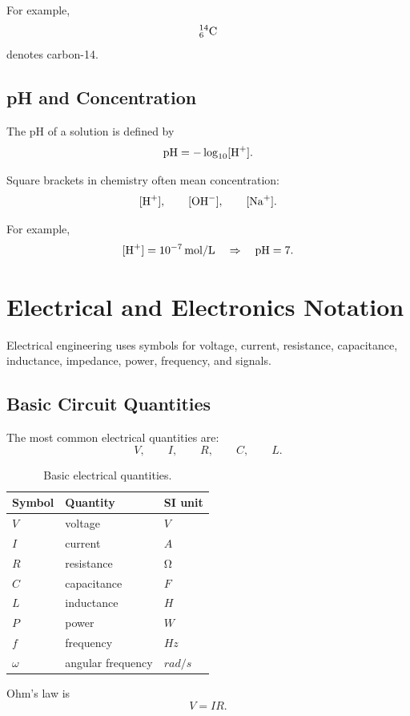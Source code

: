 \documentclass[11pt,twocolumn]{article}
\begin{document}
For example,
\[
{}^{14}_{6}\ce{C}
\]
denotes carbon-14.

\subsection{pH and Concentration}

The pH of a solution is defined by
\[
\mathrm{pH}
=
-\log_{10}[\ce{H+}].
\]

Square brackets in chemistry often mean concentration:
\[
[\ce{H+}],
\qquad
[\ce{OH-}],
\qquad
[\ce{Na+}].
\]

For example,
\[
[\ce{H+}]
=
10^{-7}\,\unit{mol/L}
\quad
\Rightarrow
\quad
\mathrm{pH}=7.
\]

\section{Electrical and Electronics Notation}

Electrical engineering uses symbols for voltage, current, resistance,
capacitance, inductance, impedance, power, frequency, and signals.

\subsection{Basic Circuit Quantities}

The most common electrical quantities are:
\[
V,
\qquad
I,
\qquad
R,
\qquad
C,
\qquad
L.
\]

\begin{table}[ht]
\centering
\small
\caption{Basic electrical quantities.}
\begin{tabular}{lll}
\toprule
Symbol & Quantity & SI unit \\
\midrule
\(V\) & voltage & \(\unit{V}\) \\
\(I\) & current & \(\unit{A}\) \\
\(R\) & resistance & \(\unit{\ohm}\) \\
\(C\) & capacitance & \(\unit{F}\) \\
\(L\) & inductance & \(\unit{H}\) \\
\(P\) & power & \(\unit{W}\) \\
\(f\) & frequency & \(\unit{Hz}\) \\
\(\omega\) & angular frequency & \(\unit{rad/s}\) \\
\bottomrule
\end{tabular}
\end{table}

Ohm's law is
\[
V = IR.
\]
\end{document}
